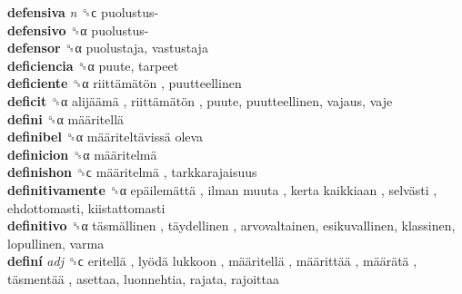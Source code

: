 \textbf{defensiva} \emph{n}  ␝ϲ   puolustus-   \\
\textbf{defensivo} ␝α   puolustus-   \\
\textbf{defensor} ␝α  puolustaja, vastustaja  \\
\textbf{deficiencia} ␝α  puute, tarpeet  \\
\textbf{deficiente} ␝α   riittämätön , puutteellinen  \\
\textbf{deficit} ␝α   alijäämä ,  riittämätön , puute, puutteellinen, vajaus, vaje  \\
\textbf{defini} ␝α   määritellä   \\
\textbf{definibel} ␝α   määriteltävissä oleva   \\
\textbf{definicion} ␝α   määritelmä   \\
\textbf{definishon} ␝ϲ   määritelmä , tarkkarajaisuus  \\
\textbf{definitivamente} ␝α   epäilemättä ,  ilman muuta ,  kerta kaikkiaan ,  selvästi , ehdottomasti, kiistattomasti  \\
\textbf{definitivo} ␝α   täsmällinen ,  täydellinen , arvovaltainen, esikuvallinen, klassinen, lopullinen, varma  \\
\textbf{definí} \emph{adj}  ␝ϲ   eritellä ,  lyödä lukkoon ,  määritellä ,  määrittää ,  määrätä ,  täsmentää , asettaa, luonnehtia, rajata, rajoittaa  \\
